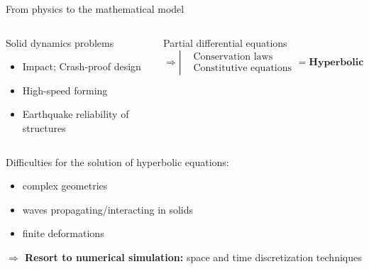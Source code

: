 \begin{frame}{From physics to the mathematical model}
\begin{overprint}
    \begin{columns}
      \begin{column}{0.45\textwidth}
        \begin{block}{Solid dynamics problems}
          \begin{itemize}
          \item[] Impact; Crash-proof design
          \item[] High-speed forming
          \item[] Earthquake reliability of structures 
          \end{itemize}
        \end{block}
      \end{column}
      
      \begin{column}{0.55\textwidth}
        \begin{block}{Partial differential equations}
          \begin{equation*}
            \Rightarrow \left\lvert
              \begin{aligned}
                & \text{Conservation laws} \\
                & \text{Constitutive equations} 
              \end{aligned}
            \right. = \textbf{Hyperbolic system}
          \end{equation*}
        \end{block}
      \end{column}
    \end{columns}
    
    \begin{block}{Difficulties for the solution of hyperbolic equations:}
      \begin{itemize}
      \item complex geometries
      \item waves propagating/interacting in solids
      \item finite deformations
      \end{itemize}
    \end{block}
    \textbf{$\Rightarrow$ Resort to numerical simulation:} space and time discretization techniques
  \end{overprint}
\end{frame}


